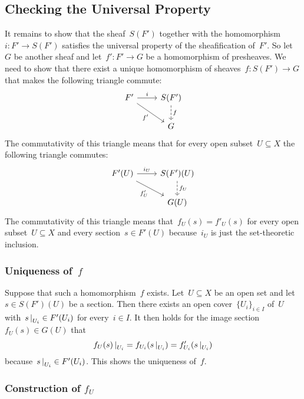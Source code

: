 \subsection*{Checking the Universal Property}

It remains to show that the sheaf~$S(F')$ together with the homomorphism~$i \colon F' \to S(F')$ satisfies the universal property of the sheafification of~$F'$.
So let~$G$ be another sheaf and let~$f' \colon F' \to G$ be a homomorphism of presheaves.
We need to show that there exist a unique homomorphism of sheaves~$f \colon S(F') \to G$ that makes the following triangle commute:
\[
  \begin{tikzcd}
      F'
      \arrow{r}[above]{i}
      \arrow{dr}[below left]{f'}
    & S(F')
      \arrow[dashed]{d}[right]{f}
    \\
    {}
    & G
  \end{tikzcd}
\]
The commutativity of this triangle means that for every open subset~$U \subseteq X$ the following triangle commutes:
\[
  \begin{tikzcd}
      F'(U)
      \arrow{r}[above]{i_U}
      \arrow{dr}[below left]{f'_U}
    & S(F')(U)
      \arrow[dashed]{d}[right]{f_U}
    \\
    {}
    & G(U)
  \end{tikzcd}
\]
The commutativity of this triangle means that~$f_U(s) = f'_U(s)$ for every open subset~$U \subseteq X$ and every section~$s \in F'(U)$ because~$i_U$ is just the set-theoretic inclusion.





\subsubsection*{Uniqueness of~$f$}

Suppose that such a homomorphism~$f$ exists.
Let~$U \subseteq X$ be an open set and let~$s \in S(F')(U)$ be a section.
Then there exists an open cover~$\{ U_i \}_{i \in I}$ of~$U$ with~$\restrict{s}{U_i} \in F'(U_i)$ for every~$i \in I$.
It then holds for the image section~$f_U(s) \in G(U)$ that
\[
    \restrict{ f_U(s) }{U_i}
  = f_{U_i}( \restrict{s}{U_i} )
  = f'_{U_i}( \restrict{s}{U_i} )
\]
because~$\restrict{s}{U_i} \in F'(U_i)$.
This shows the uniqueness of~$f$.



\subsubsection*{Construction of $f_U$}

